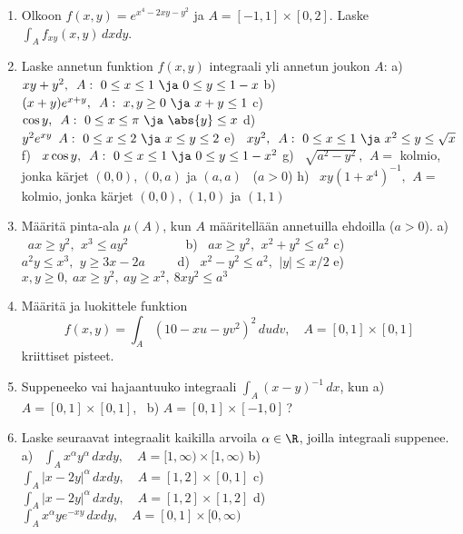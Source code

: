 \Harj
\begin{enumerate}

\item
Olkoon $f(x,y)=e^{x^4-2xy-y^2}$ ja $A=[-1,1]\times[0,2]$. Laske $\int_A f_{xy}(x,y)\,dxdy$.

\item
Laske annetun funktion $f(x,y)$ integraali yli annetun joukon $A$: \vspace{1mm}\newline
a) \ $xy+y^2,\,\ A:\ 0 \le x \le 1\ \ja\ 0 \le y \le 1-x$ \newline
b) \ $(x+y)e^{x+y},\,\ A:\ x,y \ge 0\ \ja\ x+y \le 1$ \newline
c) \ $\cos y,\,\ A:\ 0 \le x \le \pi\ \ja\ \abs{y} \le x$ \newline
d) \ $y^2e^{xy}\,\ A:\ 0 \le x \le 2\ \ja\ x \le y \le 2$ \newline
e) \ $xy^2,\,\ A:\ 0 \le x \le 1\ \ja\ x^2 \le y \le \sqrt{x}$ \newline
f) \ $x\cos y,\,\ A:\ 0 \le x \le 1\ \ja\ 0 \le y \le 1-x^2$ \newline
g) \ $\sqrt{a^2-y^2}\,,\,\ A=$ kolmio, jonka kärjet $(0,0)$, $(0,a)$ ja $(a,a)$ \ ($a>0$)
\newline
h) \ $xy(1+x^4)^{-1},\,\ A=$ kolmio, jonka kärjet $(0,0)$, $(1,0)$ ja $(1,1)$ 

\item
Määritä pinta-ala $\mu(A)$, kun $A$ määritellään annetuilla ehdoilla ($a>0$).
\vspace{1mm}\newline 
a) \ $ax \ge y^2,\,\ x^3 \le ay^2 \qquad\qquad\,$
b) \ $ax \ge y^2,\,\ x^2+y^2 \le a^2$ \newline
c) \ $a^2y \le x^3,\,\ y \ge 3x-2a \qquad\ $
d) \ $x^2-y^2 \le a^2,\,\ |y| \le x/2$ \newline
e) \ $x,y \ge 0,\ ax \ge y^2,\ ay \ge x^2,\ 8xy^2 \le a^3$

\item
Määritä ja luokittele funktion
\[
f(x,y)=\int_A (10-xu-yv^2)^2\,dudv, \quad A=[0,1]\times[0,1]
\]
kriittiset pisteet.

\item
Suppeneeko vai hajaantuuko integraali $\int_A(x-y)^{-1}\,dx$, kun \newline
a) $A=[0,1]\times[0,1]$, \ b) $A=[0,1]\times[-1,0]$\,?

\item
Laske seuraavat integraalit kaikilla arvoila $\alpha\in\R$, joilla integraali suppenee.
\vspace{1mm}
a) \ $\int_A x^\alpha y^\alpha\,dxdy, \quad A=[1,\infty)\times[1,\infty)$ \newline
b) \ $\int_A |x-2y|^\alpha\,dxdy, \quad A=[1,2]\times[0,1]$ \vspace{1mm}\newline
c) \ $\int_A |x-2y|^\alpha\,dxdy, \quad A=[1,2]\times[1,2]$ \vspace{1mm}\newline
d) \ $\int_A x^\alpha ye^{-xy}\,dxdy, \quad A=[0,1]\times[0,\infty)$


\end{enumerate}
